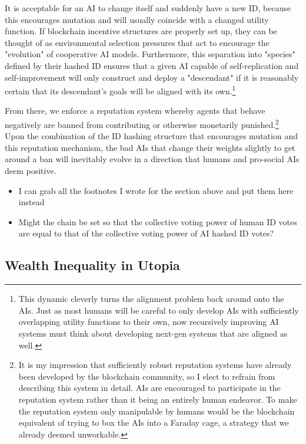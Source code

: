 \documentclass{article}[10pt]
\begin{document}
It is acceptable for an AI to change itself and suddenly have a new ID, because this encourages mutation and will usually coincide with a changed utility function.
If blockchain incentive structures are properly set up, they can be thought of as environmental selection pressures that act to encourage the "evolution" of cooperative AI models.
Furthermore, this separation into "species" defined by their hashed ID ensures that a given AI capable of self-replication and self-improvement will only construct and deploy a "descendant" if it is reasonably certain that its descendant's goals will be aligned with its own.\footnote{
    This dynamic cleverly turns the alignment problem back around onto the AIs.
    Just as most humans will be careful to only develop AIs with sufficiently overlapping utility functions to their own, now recursively improving AI systems must think about developing next-gen systems that are aligned as well.
}\par

From there, we enforce a reputation system whereby agents that behave negatively are banned from contributing or otherwise monetarily punished.\footnote{
    It is my impression that sufficiently robust reputation systems have already been developed by the blockchain community, so I elect to refrain from describing this system in detail.
    AIs are encouraged to participate in the reputation system rather than it being an entirely human endeavor.
    To make the reputation system only manipulable by humans would be the blockchain equivalent of trying to box the AIs into a Faraday cage, a strategy that we already deemed unworkable.
}
Upon the combination of the ID hashing structure that encourages mutation and this reputation mechanism, the bad AIs that change their weights slightly to get around a ban will inevitably evolve in a direction that humans and pro-social AIs deem positive.

\begin{itemize}
    \item I can grab all the footnotes I wrote for the section above and put them here instead
    \item Might the chain be set so that the collective voting power of human ID votes are equal to that of the collective voting power of AI hashed ID votes?
\end{itemize}


\subsection{Wealth Inequality in Utopia}
\end{document}
